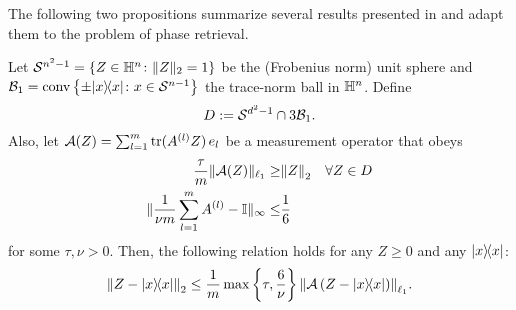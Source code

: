 The following two propositions summarize several results presented in \cite{Kabanava_2015_Stable} and adapt them to the problem of phase retrieval.

\begin{proposition}%
  \label{prop:nsp_implication}
  Let $\mathcal{S}^{n^2-1}=\left\{  Z \in \mathbb{H}^n\colon \|  Z \|_2=1 \right\}$ be the (Frobenius norm) unit sphere and $\mathcal{B}_1 = \mathrm{conv} \left\{ \pm | x \rangle \! \langle  x| \colon  x \in \mathcal{S}^{n-1} \right\}$ the trace-norm ball in $\mathbb{H}^n$.
  Define
  \[
    D := \mathcal{S}^{d^2-1} \cap 3 \mathcal{B}_1.
    \label{eq:pl.D}
  \]
  Also, let $\mathcal{A}(Z) = \sum_{l=1}^m \operatorname{tr} ( A^{(l)}  Z ) \,  {e_l}$ be a measurement operator that obeys
  \begin{align}
      \frac{ \tau}{m} \| \mathcal{A}( Z) \|_{\ell_1} \geq& {\Vert Z\Vert}_2 \quad \forall  Z \in D \label{eq:pl.nsp}\\
      \| \frac{1}{\nu m}\sum_{l=1}^m  A^{(l)} -  \mathbb{I} \|_\infty \leq& \frac{1}{6}\label{eq:pl.approx_povm}
  \end{align}
  for some $\tau,\nu >0$.
  Then, the following relation holds for any $ Z \geq 0$ and any $\ketbra x$:
  \[
    \label{eq:pl.rec_guarantee}
    \Fnorm{Z - \ketbra{x}}
    \leq \frac{1}{m} \max \left\{ \tau, \frac{6}{\nu} \right\}  \Norm{\mathcal{A}\left( Z - \ketbra{x} \right)}_{\ell_1}.
  \]
\end{proposition}
